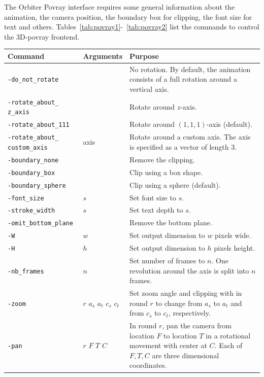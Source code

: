The Orbiter Povray interface requires some general information about the animation, 
the camera position, the boundary box for clipping, 
the font size for text and others.
Tables~\ref{tab:povray1}-~\ref{tab:povray2} list the commands to control the 3D-povray frontend.
\begin{table}
\begin{center}
\begin{tabular}{|p{4cm}|p{3cm}|p{7cm}|}
\hline
Command & Arguments & Purpose \\
\hline
\hline
\verb'-do_not_rotate' &  & No rotation. By default, the animation consists of a full rotation around a vertical axis.\\
\hline  
\verb'-rotate_about_' \verb'z_axis' &  & Rotate around $z$-axis. \\
\hline  
\verb'-rotate_about_111' &  & Rotate around $(1,1,1)$-axis (default). \\
\hline  
\verb'-rotate_about_' \verb'custom_axis' & axis & Rotate around a custom axis. The axis is specified as a vector of length 3. \\
\hline  
\verb'-boundary_none' &  & Remove the clipping. \\
\hline  
\verb'-boundary_box' &  & Clip using a box shape. \\
\hline  
\verb'-boundary_sphere' &  & Clip using a sphere (default). \\
\hline  
\verb'-font_size' & $s$  & Set font size to $s.$ \\
\hline  
\verb'-stroke_width' & $s$  & Set text depth to $s$. \\
\hline  
\verb'-omit_bottom_plane' &  & Remove the bottom plane. \\
\hline  
\verb'-W' & $w$ & Set output dimension to $w$ pixels wide. \\
\hline  
\verb'-H' & $h$ & Set output dimension to $h$ pixels height. \\
\hline  
\verb'-nb_frames' & $n$ & Set number of frames to $n$. One revolution around the axis is split into $n$ frames. \\
\hline  
\verb'-zoom' & $r$ $a_s$ $a_t$ $c_s$ $c_t$ & Set zoom angle and clipping with in round $r$ to change from $a_s$ to $a_t$ and from $c_s$ to $c_t$, respectively. \\
\hline  
\verb'-pan' & $r$ $F$ $T$ $C$ & In round $r$, pan the camera from location $F$ to location $T$ in a rotational movement with center at $C$. Each of $F,T,C$ are three dimensional coordinates.\\

\end{tabular}
\end{center}
\end{table}
